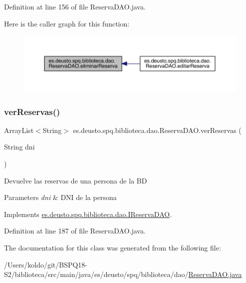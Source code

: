 Definition at line 156 of file Reserva\+D\+A\+O.\+java.

Here is the caller graph for this function\+:
\nopagebreak
\begin{figure}[H]
\begin{center}
\leavevmode
\includegraphics[width=350pt]{classes_1_1deusto_1_1spq_1_1biblioteca_1_1dao_1_1_reserva_d_a_o_a82fb1dbc3f6715103dea1b3bfb3d66b0_icgraph}
\end{center}
\end{figure}
\mbox{\label{classes_1_1deusto_1_1spq_1_1biblioteca_1_1dao_1_1_reserva_d_a_o_a553798fbb62f35db87554e0b431f527b}} 
\subsubsection{\texorpdfstring{ver\+Reservas()}{verReservas()}}
{\footnotesize\ttfamily Array\+List$<$String$>$ es.\+deusto.\+spq.\+biblioteca.\+dao.\+Reserva\+D\+A\+O.\+ver\+Reservas (\begin{DoxyParamCaption}\item[{String}]{dni }\end{DoxyParamCaption})}

Devuelve las reservas de una persona de la BD 
\begin{DoxyParams}{Parameters}
{\em dni} & D\+NI de la persona \\
\hline
\end{DoxyParams}


Implements \mbox{\hyperlink{interfacees_1_1deusto_1_1spq_1_1biblioteca_1_1dao_1_1_i_reserva_d_a_o_aab8b6916e33fd28d632bab5fe2f1801c}{es.\+deusto.\+spq.\+biblioteca.\+dao.\+I\+Reserva\+D\+AO}}.



Definition at line 187 of file Reserva\+D\+A\+O.\+java.



The documentation for this class was generated from the following file\+:\begin{DoxyCompactItemize}
\item 
/\+Users/koldo/git/\+B\+S\+P\+Q18-\/\+S2/biblioteca/src/main/java/es/deusto/spq/biblioteca/dao/\mbox{\hyperlink{_reserva_d_a_o_8java}{Reserva\+D\+A\+O.\+java}}\end{DoxyCompactItemize}
